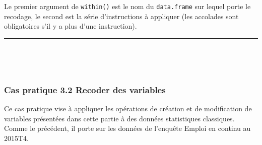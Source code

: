 \documentclass[12pt,twosided, notitlepage]{book}
\begin{document}
Le premier argument de \texttt{within()} est le nom du
\texttt{data.frame} sur lequel porte le recodage, le second est la série
d'instructions à appliquer (les accolades sont obligatoires s'il y a
plus d'une instruction).

\begin{center}\rule{0.5\linewidth}{\linethickness}\end{center}

~

~

\subsubsection{\texorpdfstring{\textbf{Cas pratique 3.2} Recoder des
variables}{Cas pratique 3.2 Recoder des variables}}\label{cas-pratique-3.2-recoder-des-variables}


Ce cas pratique vise à appliquer les opérations de création et de
modification de variables présentées dans cette partie à des données
statistiques classiques. Comme le précédent, il porte sur les données de
l'enquête Emploi en continu au 2015T4.
\end{document}
